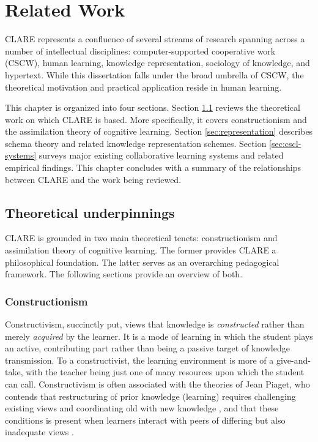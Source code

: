 

\setcounter{chapter}{6}
\chapter{Related Work}
\label{sec:related work}


CLARE represents a confluence of several streams of research
spanning across a number of intellectual disciplines: computer-supported
cooperative work (CSCW), human learning, knowledge representation,
sociology of knowledge, and hypertext.  While this dissertation falls under
the broad umbrella of CSCW, the theoretical motivation and practical
application reside in human learning.

This chapter is organized into four sections. Section \ref{sec:theory}
reviews the theoretical work on which CLARE is based.  More specifically,
it covers constructionism and the assimilation theory of cognitive
learning. Section \ref{sec:representation} describes schema theory and
related knowledge representation schemes.  Section \ref{sec:cscl-systems}
surveys major existing collaborative learning systems and related empirical
findings.  This chapter concludes with a summary of the relationships
between CLARE and the work being reviewed.



\section{Theoretical underpinnings}
\label{sec:theory}

CLARE is grounded in two main theoretical tenets: constructionism and
assimilation theory of cognitive learning. The former provides CLARE a
philosophical foundation. The latter serves as an overarching pedagogical
framework. The following sections provide an overview of both.

\subsection{Constructionism}

Constructivism, succinctly put, views that knowledge is {\it constructed\/}
rather than merely {\it acquired\/} by the learner. It is a mode of
learning in which the student plays an active, contributing part rather
than being a passive target of knowledge transmission. To a constructivist,
the learning environment is more of a give-and-take, with the teacher being
just one of many resources upon which the student can call. Constructivism
is often associated with the theories of Jean Piaget, who contends that
restructuring of prior knowledge (learning) requires challenging existing
views and coordinating old with new knowledge \cite{Piaget77}, and that
these conditions is present when learners interact with peers of differing
but also inadequate views \cite{Piaget32}.

